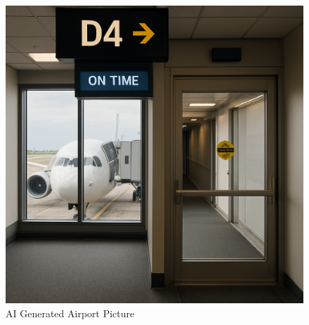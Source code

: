 \begin{figure}[H]
    \centering
    \includegraphics[width=0.75\linewidth]{img/p12.png}
    \caption{AI Generated Airport Picture}
    \label{fig:p12}
\end{figure}

